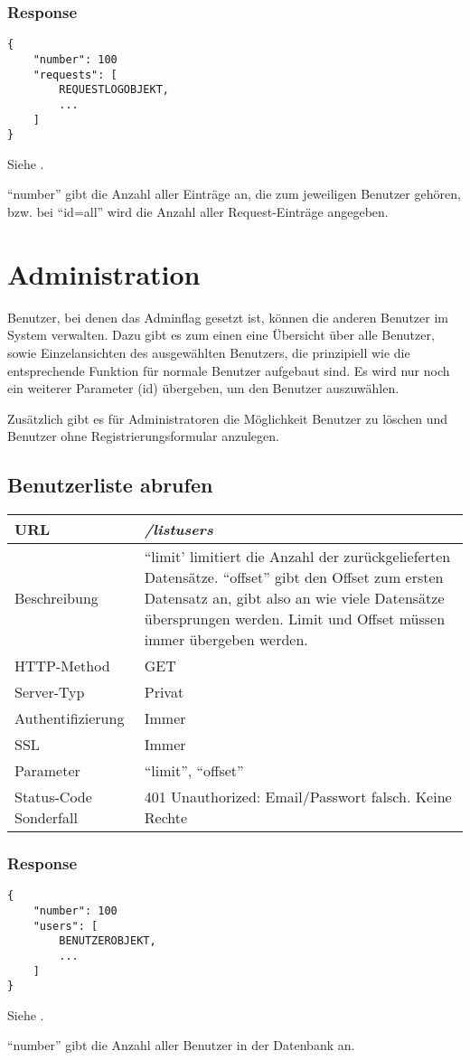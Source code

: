 \documentclass[ngerman,titlepage,parskip=true]{scrartcl}
\newcommand{\requestURL}[1]{\textit{#1}}
\newcommand{\request}[9]
{\subsection{#1}
\begin{tabular}{|p{0.2\textwidth}|p{0.7\textwidth}|}
\hline
  URL & \requestURL{#2}\\\hline
    Beschreibung & #3\\\hline
  HTTP-Method & #4\\\hline
  Server-Typ & #5\\\hline
  Authentifizierung & #6\\\hline
  SSL & #7\\\hline
  Parameter & #8\\\hline
  Status-Code Sonderfall & #9\\\hline
 \end{tabular}\vspace*{1em}}
{}%
{}%
{}%
{}%
{}%
{}%
{}%
{}%
\begin{document}
	
\subsubsection{Response}		
		\begin{lstlisting}
{
	"number": 100
	"requests": [
		REQUESTLOGOBJEKT,
		...
	]
}
		\end{lstlisting}
		
Siehe .

		``number'' gibt die Anzahl aller Einträge an, die zum jeweiligen Benutzer gehören, bzw. bei \mbox{``id=all''} wird die Anzahl aller Request-Einträge angegeben.
		
	

\section{Administration}

Benutzer, bei denen das Adminflag gesetzt ist, können die anderen Benutzer im System verwalten. 
Dazu gibt es zum einen eine Übersicht über alle Benutzer, sowie Einzelansichten des ausgewählten Benutzers, die prinzipiell wie die entsprechende Funktion für normale Benutzer aufgebaut sind.
Es wird nur noch ein weiterer Parameter (id) übergeben, um den Benutzer auszuwählen.

Zusätzlich gibt es für Administratoren die Möglichkeit Benutzer zu löschen und Benutzer ohne Registrierungsformular anzulegen.

\request{Benutzerliste abrufen}%
{/listusers}%
{``limit' limitiert die Anzahl der zurückgelieferten Datensätze. ``offset'' gibt den Offset zum ersten Datensatz an, gibt also an wie viele Datensätze übersprungen werden. Limit und Offset müssen immer übergeben werden.}%
{GET}%
{Privat}%
{Immer}%
{Immer}%
{``limit'', ``offset''}%
{401 Unauthorized: Email/Passwort falsch. Keine Rechte}%
\subsubsection{Response}		
		\begin{lstlisting}
{
	"number": 100
	"users": [
		BENUTZEROBJEKT,
		...
	]
}
		\end{lstlisting}
		
Siehe .

		``number'' gibt die Anzahl aller Benutzer in der Datenbank an.
		
\clearpage
\end{document}
